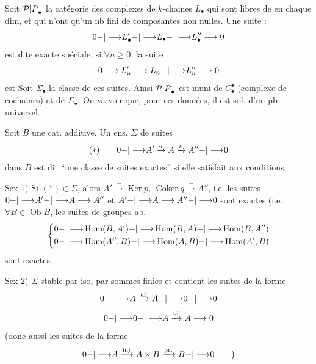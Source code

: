 Soit ${\mathcal P|P}_\bullet$ la catégorie des complexes de $k$-chaines $L_\bullet$
qui sont libres de  en chaque dim,
et qui n'ont qu'un nb fini de composantes
non nulles. Une suite :
\[
0{-|\longrightarrow}L'_\bullet{-|\longrightarrow}L_\bullet{-|\longrightarrow}L''_\bullet\longrightarrow0
\]
 est dite exacte spéciale, si $\forall n\geqslant0$, la suite
\[
0\longrightarrow L'_n\longrightarrow L_n{-|\longrightarrow}L''_n\longrightarrow0
\]
est  Soit $\Sigma_\bullet$ la
classe de ces suites. Ainsi ${\mathcal P|P}_\bullet$ est muni de
$C_\bullet^\bullet$ (complexe de cochaines) et de $\Sigma_\bullet$. On va
voir que, pour ces données, il est sol. d'un
pb universel.
\margin{!}

Soit  $B$ une cat. additive. Un ens. $\Sigma$ de
suites
\[
(*)\qquad 0{-|\longrightarrow}A'\xrightarrow{q}A\xrightarrow{p}A''{-|\longrightarrow}0
\]
dans $B$ est dit ``une classe de suites exactes''
si elle satisfait aux conditions

Sex 1) Si $(*)\in\Sigma$, alors $A'\xrightarrow{\sim}\operatorname{Ker}p$, $\operatorname{Coker}q\xrightarrow{\sim}A''$,
i.e. les suites $0{-|\longrightarrow}A'{-|\longrightarrow}A\longrightarrow A''$ et 
$A'{-|\longrightarrow}A\longrightarrow A''{-|\longrightarrow}0$
sont exactes (i.e. $\forall B\in\operatorname{Ob}B$, les suites de groupes
ab.
\[
\left\{\begin{aligned}
0&{-|\longrightarrow}\operatorname{Hom}(B,A'){-|\longrightarrow}\operatorname{Hom}(B,A){-|\longrightarrow}\operatorname{Hom}(B,A'')\\
0&{-|\longrightarrow}\operatorname{Hom}(A'',B){-|\longrightarrow}\operatorname{Hom}(A,B){-|\longrightarrow}\operatorname{Hom}(A',B)
\end{aligned}\right.
\]
 sont exactes.

Sex 2) $\Sigma$ stable par iso, par sommes finies
et contient les suites de la forme
\[
0{-|\longrightarrow}A\xrightarrow{\mathrm{id}}A{-|\longrightarrow}0{-|\longrightarrow}0
\]
\[
0{-|\longrightarrow}0{-|\longrightarrow}A\xrightarrow{\mathrm{id}}A\longrightarrow0
\]
(donc aussi les suites de la forme
\[
0{-|\longrightarrow}A\xrightarrow{\mathrm{inj}}A\times B\xrightarrow{\mathrm{pr.}}B{-|\longrightarrow}0\qquad)
\]

